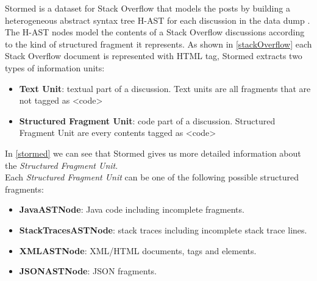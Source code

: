 \documentclass[12pt,mscthesis]{usiinfthesis}
\begin{document}
	 Stormed is a dataset for Stack Overflow that models the posts by building a heterogeneous abstract syntax tree H-AST for each discussion in the data dump \cite{Ponz2015a}.  The H-AST nodes model the contents of a Stack Overflow discussions according to the kind of structured fragment it represents. As shown in \cref{stackOverflow} each Stack Overflow document is represented with HTML tag, Stormed extracts two types of information units:
	 	 \begin{itemize}
		\item \textbf{Text Unit}: textual part of a discussion. Text units are all fragments that are not tagged as <code>	
		\item \textbf{Structured Fragment Unit}: code part of a discussion. Structured Fragment Unit are every contents tagged as <code> 
	 \end{itemize}

	 In \cref{stormed} we can see that Stormed gives us more detailed information about the \textit{Structured Fragment Unit}.\\
	 Each \textit{Structured Fragment Unit} can be one of the following possible structured fragments:
	 \begin{itemize}
	 \item \textbf{JavaASTNode}: Java code including incomplete fragments.
	 \item \textbf{StackTracesASTNode}: stack traces including incomplete stack trace lines.
	 \item \textbf{XMLASTNode}: XML/HTML documents, tags and elements.
	 \item \textbf{JSONASTNode}: JSON fragments.
	 \end{itemize}
\end{document}
